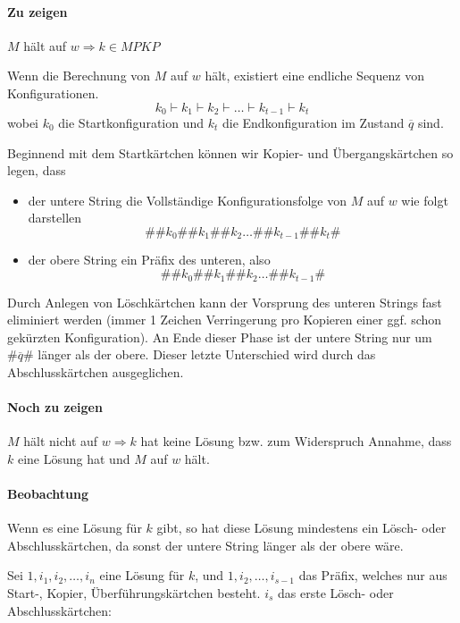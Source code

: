 \paragraph*{Zu zeigen} $M$ hält auf $w \Rightarrow k \in MPKP$

\par\medskip Wenn die Berechnung von $M$ auf $w$ hält, existiert eine endliche Sequenz von Konfigurationen. $$ k_0 \vdash k_1 \vdash k_2 \vdash \dots \vdash k_{t-1} \vdash k_t $$ wobei $k_0$ die Startkonfiguration und $k_t$ die Endkonfiguration im Zustand $\overline{q}$ sind.

\par\medskip Beginnend mit dem Startkärtchen können wir Kopier- und Übergangskärtchen so legen, dass
\begin{itemize}
	\item der untere String die Vollständige Konfigurationsfolge von $M$ auf $w$ wie folgt darstellen $$ \#\#k_0\#\#k_1\#\#k_2 \dots \#\#k_{t-1}\#\#k_t\# $$
	\item der obere String ein Präfix des unteren, also $$ \#\#k_0\#\#k_1\#\#k_2 \dots \#\#k_{t-1}\# $$
\end{itemize}

\par\medskip Durch Anlegen von Löschkärtchen kann der Vorsprung des unteren Strings fast eliminiert werden (immer 1 Zeichen Verringerung pro Kopieren einer ggf. schon gekürzten Konfiguration). An Ende dieser Phase ist der untere String nur um $\#\overline{q}\#$ länger als der obere. Dieser letzte Unterschied wird durch das Abschlusskärtchen ausgeglichen.

\paragraph*{Noch zu zeigen} $M$ hält nicht auf $w \Rightarrow k$ hat keine Lösung bzw. zum Widerspruch Annahme, dass $k$ eine Lösung hat und $M$ auf $w$ hält.

\paragraph*{Beobachtung} Wenn es eine Lösung für $k$ gibt, so hat diese Lösung mindestens ein Lösch- oder Abschlusskärtchen, da sonst der untere String länger als der obere wäre.

\par\medskip Sei $1,i_1,i_2,\dots,i_n$ eine Lösung für $k$, und $1,i_2,\dots,i_{s-1}$ das Präfix, welches nur aus Start-, Kopier, Überführungskärtchen besteht. $i_s$ das erste Lösch- oder Abschlusskärtchen:

